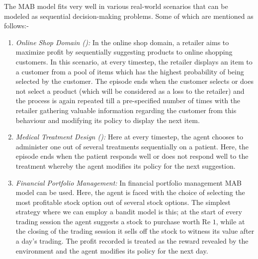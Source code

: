 
The MAB model fits very well in various real-world scenarios that can be modeled as sequential decision-making problems. Some of which are mentioned as follows:-
\begin{enumerate}
\item \emph{Online Shop Domain (\cite{ghavamzadeh2015bayesian}):} In the online shop domain, a retailer aims to maximize profit by sequentially suggesting products to online shopping customers. In this scenario, at every timestep,  the retailer displays an item to a customer from a pool of items which has the highest probability of being selected by the customer. The episode ends when the customer selects or does not select a product (which will be considered as a loss to the retailer) and the process is again repeated till a pre-specified number of times with the retailer gathering valuable information regarding the customer from this behaviour and modifying its policy to display the next item.
\item \emph{Medical Treatment Design (\cite{thompson1933likelihood}):} Here at every timestep, the agent chooses to administer one out of several treatments sequentially on a patient. Here, the episode ends when the patient responds well or does not respond well to the treatment whereby the agent modifies its policy for the next suggestion.
\item \emph{Financial Portfolio Management:} In financial portfolio management MAB model can be used. Here, the agent is faced with the choice of selecting the most profitable stock option out of several stock options. The simplest strategy where we can employ a bandit model is this; at the start of every trading session the agent suggests a stock to purchase worth Re $1$, while at the closing of the trading session it sells off the stock to witness its value after a day's trading. The  profit recorded is treated as the reward revealed by the environment and the agent modifies its policy for the next day.
\end{enumerate}


